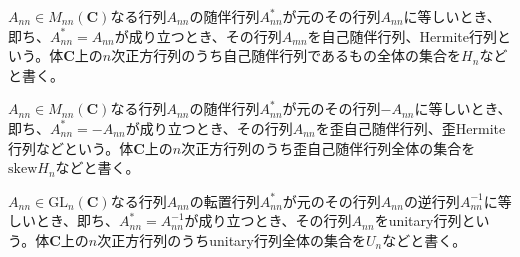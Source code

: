 \documentclass[dvipdfmx]{jsarticle}
\begin{document}
\begin{dfn}
$A_{nn} \in M_{nn}\left( \mathbf{C} \right)$なる行列$A_{nn}$の随伴行列$A_{nn}^{*}$が元のその行列$A_{nn}$に等しいとき、即ち、$A_{nn}^{*} = A_{nn}$が成り立つとき、その行列$A_{mn}$を自己随伴行列、Hermite行列という。体$\mathbf{C}$上の$n$次正方行列のうち自己随伴行列であるもの全体の集合を$H_{n}$などと書く。
\end{dfn}
\begin{dfn}
$A_{nn} \in M_{nn}\left( \mathbf{C} \right)$なる行列$A_{nn}$の随伴行列$A_{nn}^{*}$が元のその行列$- A_{nn}$に等しいとき、即ち、$A_{nn}^{*} = - A_{nn}$が成り立つとき、その行列$A_{nn}$を歪自己随伴行列、歪Hermite行列などという。体$\mathbf{C}$上の$n$次正方行列のうち歪自己随伴行列全体の集合を${\mathrm{skew}}H_{n}$などと書く。
\end{dfn}
\begin{dfn}
$A_{nn} \in {\mathrm{GL}}_{n}\left( \mathbf{C} \right)$なる行列$A_{nn}$の転置行列$A_{nn}^{*}$が元のその行列$A_{nn}$の逆行列$A_{nn}^{- 1}$に等しいとき、即ち、$A_{nn}^{*} = A_{nn}^{- 1}$が成り立つとき、その行列$A_{nn}$をunitary行列という。体$\mathbf{C}$上の$n$次正方行列のうちunitary行列全体の集合を$U_{n}$などと書く。
\end{dfn}
\end{document}
